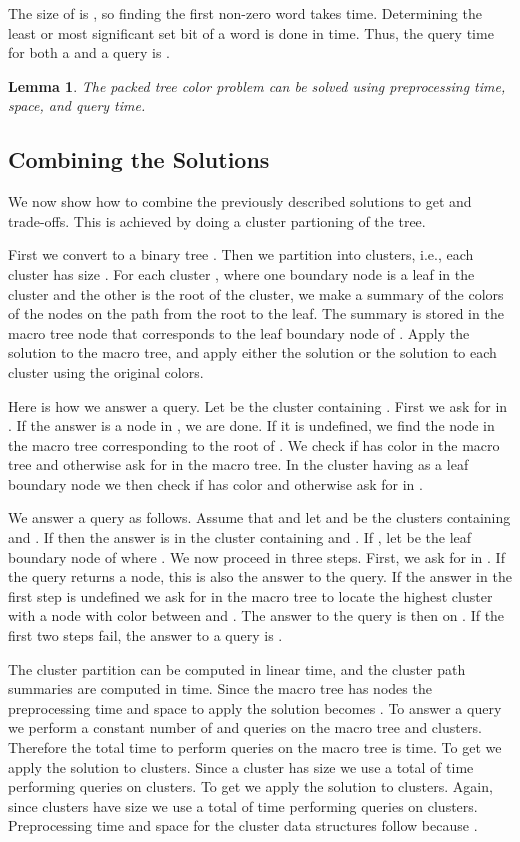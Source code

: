\documentclass[11pt]{article}
\newtheorem{lemma}{Lemma}
\begin{document}
The size of  is , so finding the first non-zero word takes  time. Determining the least or most significant set bit of a word is done in  time. Thus, the query time for both a  and a  query is .

\begin{lemma}
The packed tree color problem can be solved using  preprocessing time,   space, and  query time.
\end{lemma}

\subsection{Combining the Solutions}
We now show how to combine the previously described solutions to get  and  trade-offs. This is achieved by doing a cluster partioning of the tree.

First we convert  to a binary tree . Then we partition  into  clusters, i.e., each cluster has size . For each cluster , where one boundary node is a leaf in the cluster and the other is the root of the cluster, we make a summary of the colors of the nodes on the path from the root to the leaf. The summary is stored in the macro tree node that corresponds to the leaf boundary node of . Apply the  solution to the macro tree, and apply either the  solution or the  solution to each cluster using the original colors.

Here is how we answer a  query. Let  be the cluster containing . First we ask for  in . If the answer is a node in , we are done. If it is undefined, we find the node  in the macro tree corresponding to the root of . We check if  has color  in the macro tree and otherwise ask for  in the macro tree. In the cluster  having  as a leaf boundary node we then check if  has color  and otherwise ask for  in .

We answer a  query as follows. Assume that  and let  and  be the clusters containing  and . If  then the answer is  in the cluster containing  and . If , let  be the leaf boundary node of  where . We now proceed in three steps. First, we ask for  in . If the query returns a node, this is also the answer to the  query. If the answer in the first step is undefined we ask for  in the macro tree to locate the highest cluster with a node with color  between  and . The answer to the query is then  on . If the first two steps fail, the answer to a query is .

The cluster partition can be computed in linear time, and the cluster path summaries are computed in  time. Since the macro tree has  nodes the preprocessing time and space to apply the  solution becomes . To answer a query we perform a constant number of  and  queries on the macro tree and clusters. Therefore the total time to perform queries on the macro tree is  time. To get  we apply the  solution to clusters. Since a cluster has size  we use a total of  time performing queries on clusters. To get  we apply the   solution to clusters. Again, since clusters have size  we use a total of  time performing queries on clusters. Preprocessing time and space for the cluster data structures follow because .
\end{document}
